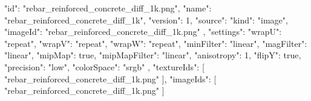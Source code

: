 {
  "id": "rebar_reinforced_concrete_diff_1k.png",
  "name": "rebar_reinforced_concrete_diff_1k",
  "version": 1,
  "source": {
    "kind": "image",
    "imageId": "rebar_reinforced_concrete_diff_1k.png"
  },
  "settings": {
    "wrapU": "repeat",
    "wrapV": "repeat",
    "wrapW": "repeat",
    "minFilter": "linear",
    "magFilter": "linear",
    "mipMap": true,
    "mipMapFilter": "linear",
    "anisotropy": 1,
    "flipY": true,
    "precision": "low",
    "colorSpace": "srgb"
  },
  "textureIds": [
    "rebar_reinforced_concrete_diff_1k.png"
  ],
  "imageIds": [
    "rebar_reinforced_concrete_diff_1k.png"
  ]
}
